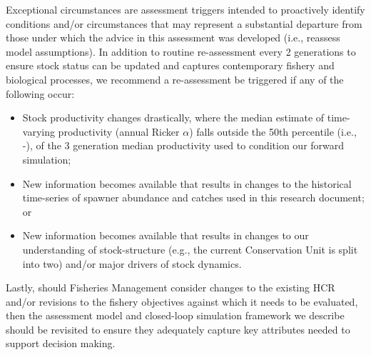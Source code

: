 \documentclass[french,11pt]{book}
\begin{document}
Exceptional circumstances are assessment triggers intended to proactively identify conditions and/or circumstances that may represent a substantial departure from those under which the advice in this assessment was developed (i.e., reassess model assumptions). In addition to routine re-assessment every 2 generations to ensure stock status can be updated and captures contemporary fishery and biological processes, we recommend a re-assessment be triggered if any of the following occur:
\begin{itemize}
\item
  Stock productivity changes drastically, where the median estimate of time-varying productivity (annual Ricker \(\alpha\)) falls outside the 50th percentile (i.e., -), of the 3 generation median productivity used to condition our forward simulation;
\item
  New information becomes available that results in changes to the historical time-series of spawner abundance and catches used in this research document; or
\item
  New information becomes available that results in changes to our understanding of stock-structure (e.g., the current Conservation Unit is split into two) and/or major drivers of stock dynamics.
\end{itemize}
Lastly, should Fisheries Management consider changes to the existing HCR and/or revisions to the fishery objectives against which it needs to be evaluated, then the assessment model and closed-loop simulation framework we describe should be revisited to ensure they adequately capture key attributes needed to support decision making.
\end{document}
